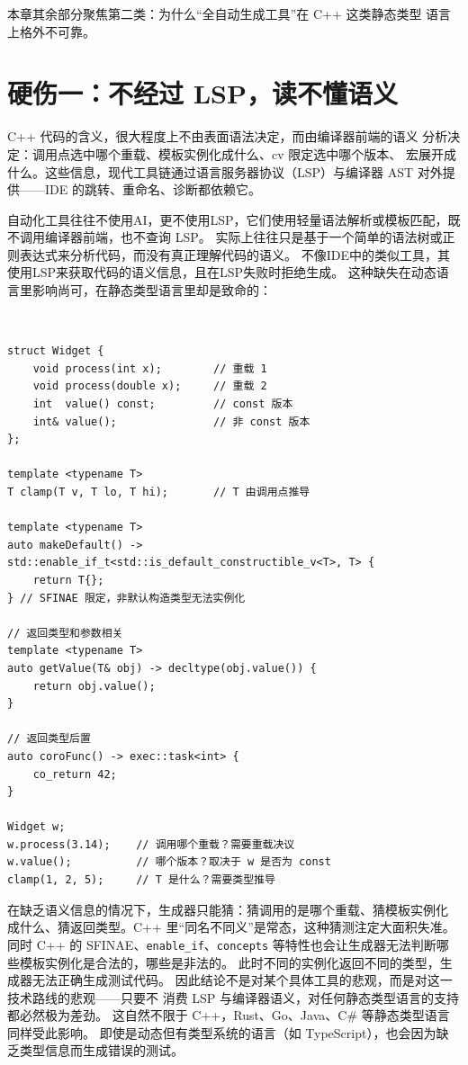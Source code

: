 \documentclass[12pt,a4paper,fontset=fandol]{ctexbook}
\newcommand{\cpplabel}{%
  \begin{tcolorbox}[enhanced,colback=cppheadbg,colframe=cppheadbg,
    arc=1mm,boxrule=0mm,left=6pt,right=6pt,top=2pt,bottom=2pt,
    halign=left,oversize]
    \textcolor{white}{\small\bfseries C++}
  \end{tcolorbox}\vspace{-4pt}}
\begin{document}
本章其余部分聚焦第二类：为什么“全自动生成工具”在 C++ 这类静态类型
语言上格外不可靠。

\section{硬伤一：不经过 LSP，读不懂语义}

C++ 代码的含义，很大程度上不由表面语法决定，而由编译器前端的语义
分析决定：调用点选中哪个重载、模板实例化成什么、cv 限定选中哪个版本、
宏展开成什么。这些信息，现代工具链通过语言服务器协议（LSP）与编译器
AST 对外提供——IDE 的跳转、重命名、诊断都依赖它。

自动化工具往往不使用AI，更不使用LSP，它们使用轻量语法解析或模板匹配，既不调用编译器前端，也不查询 LSP。
实际上往往只是基于一个简单的语法树或正则表达式来分析代码，而没有真正理解代码的语义。
不像IDE中的类似工具，其使用LSP来获取代码的语义信息，且在LSP失败时拒绝生成。
这种缺失在动态语言里影响尚可，在静态类型语言里却是致命的：

\cpplabel
\begin{lstlisting}
struct Widget {
    void process(int x);        // 重载 1
    void process(double x);     // 重载 2
    int  value() const;         // const 版本
    int& value();               // 非 const 版本
};

template <typename T>
T clamp(T v, T lo, T hi);       // T 由调用点推导

template <typename T>
auto makeDefault() -> std::enable_if_t<std::is_default_constructible_v<T>, T> {
    return T{};
} // SFINAE 限定，非默认构造类型无法实例化

// 返回类型和参数相关
template <typename T>
auto getValue(T& obj) -> decltype(obj.value()) {
    return obj.value();
}

// 返回类型后置
auto coroFunc() -> exec::task<int> {
    co_return 42;
}

Widget w;
w.process(3.14);    // 调用哪个重载？需要重载决议
w.value();          // 哪个版本？取决于 w 是否为 const
clamp(1, 2, 5);     // T 是什么？需要类型推导
\end{lstlisting}

在缺乏语义信息的情况下，生成器只能猜：猜调用的是哪个重载、猜模板实例化
成什么、猜返回类型。C++ 里“同名不同义”是常态，这种猜测注定大面积失准。
同时 C++ 的 SFINAE、\texttt{enable\_if}、\texttt{concepts} 等特性也会让生成器无法判断哪些模板实例化是合法的，哪些是非法的。
此时不同的实例化返回不同的类型，生成器无法正确生成测试代码。
因此结论不是对某个具体工具的悲观，而是对这一技术路线的悲观——只要不
消费 LSP 与编译器语义，对任何静态类型语言的支持都必然极为差劲。
这自然不限于 C++，Rust、Go、Java、C\# 等静态类型语言同样受此影响。
即使是动态但有类型系统的语言（如 TypeScript），也会因为缺乏类型信息而生成错误的测试。
\end{document}
